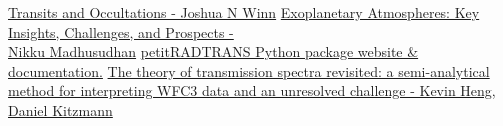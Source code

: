 \documentclass[12pt]{article}
\numberwithin{equation}{subsection} %
\numberwithin{figure}{subsection} %
\numberwithin{table}{subsection} %
\begin{document}
%
%
\pagebreak
%
{}
\begin{thebibliography}{999}
\href{https://arxiv.org/abs/1001.2010}{Transits and Occultations - Joshua N Winn}
\href{https://ui.adsabs.harvard.edu/abs/2019ARA%26A..57..617M/abstract}{Exoplanetary Atmospheres: Key Insights, Challenges, and Prospects -\\ Nikku Madhusudhan}
\href{https://petitradtrans.readthedocs.io/en/latest/index.html}{petitRADTRANS Python package website \& documentation.}
\href{https://academic.oup.com/mnras/article/470/3/2972/3866925}{The theory of transmission spectra revisited: a semi-analytical method for interpreting WFC3 data and an unresolved challenge -  Kevin Heng, Daniel Kitzmann}
\end{thebibliography}
\end{document}
